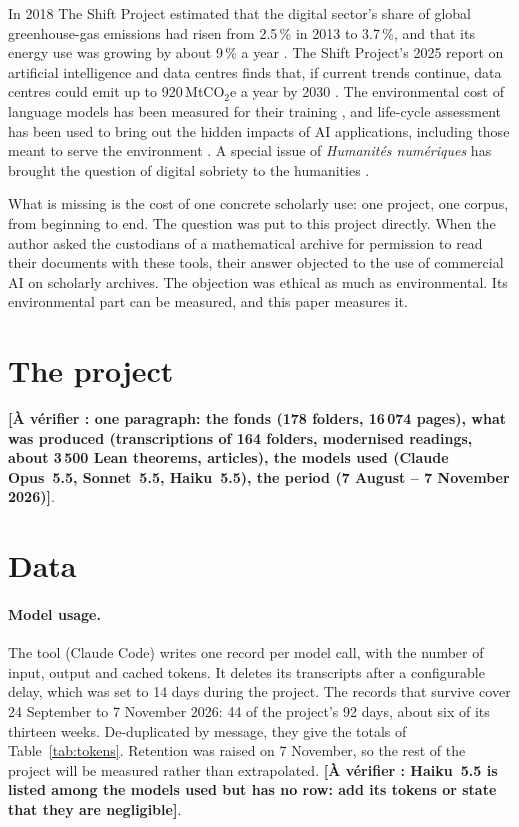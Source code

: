 \documentclass[11pt,a4paper]{article}
\newcommand{\todo}[1]{\textbf{[À vérifier : #1]}}
\begin{document}
In 2018 The Shift Project estimated that the digital sector's share of global greenhouse-gas emissions had risen from 2.5\,\% in 2013 to 3.7\,\%, and that its energy use was growing by about 9\,\% a year \citep{shift2018}. The Shift Project's 2025 report on artificial intelligence and data centres finds that, if current trends continue, data centres could emit up to 920\,MtCO$_2$e a year by 2030 \citep{shift2025}. The environmental cost of language models has been measured for their training \citep{luccioni2023,morand2026}, and life-cycle assessment has been used to bring out the hidden impacts of AI applications, including those meant to serve the environment \citep{ligozat2022}. A special issue of \emph{Humanités numériques} has brought the question of digital sobriety to the humanities \citep{baillot2025}.

What is missing is the cost of one concrete scholarly use: one project, one corpus, from beginning to end. The question was put to this project directly. When the author asked the custodians of a mathematical archive for permission to read their documents with these tools, their answer objected to the use of commercial AI on scholarly archives. The objection was ethical as much as environmental. Its environmental part can be measured, and this paper measures it.

\section{The project}

\todo{one paragraph: the fonds (178 folders, 16\,074 pages), what was produced (transcriptions of 164 folders, modernised readings, about 3\,500 Lean theorems, articles), the models used (Claude Opus~5.5, Sonnet~5.5, Haiku~5.5), the period (7 August -- 7 November 2026)}.

\section{Data}

\paragraph{Model usage.} The tool (Claude Code) writes one record per model call, with the number of input, output and cached tokens. It deletes its transcripts after a configurable delay, which was set to 14 days during the project. The records that survive cover 24 September to 7 November 2026: 44 of the project's 92 days, about six of its thirteen weeks. De-duplicated by message, they give the totals of Table~\ref{tab:tokens}. Retention was raised on 7 November, so the rest of the project will be measured rather than extrapolated. \todo{Haiku~5.5 is listed among the models used but has no row: add its tokens or state that they are negligible}.
\end{document}
